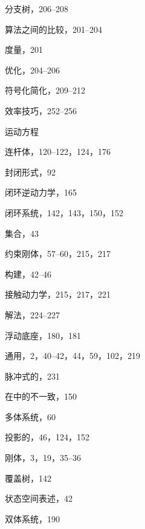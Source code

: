 \documentclass[10pt,a4paper]{book}
\theoremstyle{thmstyle} %
\theoremstyle{defstyle} %
\theoremstyle{prostyle} %
\begin{document}
分支树，206–208



算法之间的比较，201–204



度量，201



优化，204–206



符号化简化，209–212



效率技巧，252–256



运动方程



连杆体，120–122，124，176



封闭形式，92



闭环逆动力学，165



闭环系统，142，143，150，152



集合，43



约束刚体，57–60，215，217



构建，42–46



接触动力学，215，217，221



解法，224–227



浮动底座，180，181



通用，2，40–42，44，59，102，219



脉冲式的，231



在中的不一致，150



多体系统，60



投影的，46，124，152



刚体，3，19，35–36



覆盖树，142



状态空间表述，42



双体系统，190
\end{document}
